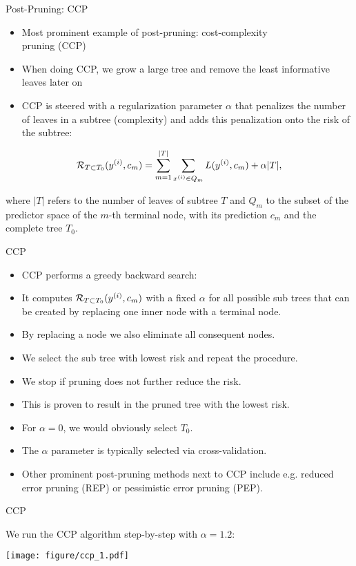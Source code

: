 \documentclass[11pt,compress,t,notes=noshow, xcolor=table]{beamer}
\begin{document}
\begin{vbframe}{Post-Pruning: CCP}
\begin{itemize}
\item Most prominent example of post-pruning: cost-complexity \\ pruning (CCP)
\item When doing CCP, we grow a large tree and remove the least informative leaves later on
\item CCP is steered with a regularization parameter $\alpha$ that penalizes the number of leaves in a subtree (complexity) and adds this penalization onto the risk of the subtree:
\end{itemize}

$$\mathcal{R}_{T \subset T_0}(y^{(i)}, c_m) = \sum_{m=1}^{|T|} \sum_{x^{(i)} \in Q_m} L(y^{(i)}, c_m) + \alpha |T|,$$

where $|T|$ refers to the number of leaves of subtree $T$ and $Q_m$ to the subset of the predictor space of the $m$-th terminal node, with its prediction $c_m$ and the complete tree $T_0$.

\end{vbframe}

\begin{vbframe}{CCP}
\begin{itemize}
\item CCP performs a greedy backward search:
\item It computes $\mathcal{R}_{T \subset T_0}(y^{(i)}, c_m)$ with a fixed $\alpha$ for all possible sub trees that can be created by replacing one inner node with a terminal node.
\item By replacing a node we also eliminate all consequent nodes.
\item We select the sub tree with lowest risk and repeat the procedure.
\item We stop if pruning does not further reduce the risk.
\item This is proven to result in the pruned tree with the lowest risk.
\item For $\alpha = 0$, we would obviously select $T_0$.
\item The $\alpha$ parameter is typically selected via cross-validation.
\item Other prominent post-pruning methods next to CCP include e.g. reduced error pruning (REP) or pessimistic error pruning (PEP).
\end{itemize}
\end{vbframe}


\begin{frame}{CCP}

We run the CCP algorithm step-by-step with $\alpha = 1.2$:
\vspace{0.25cm}

\color{fgcolor}

{\centering \texttt{[image: figure/ccp\_1.pdf]} 

}

\end{frame}
\end{document}
